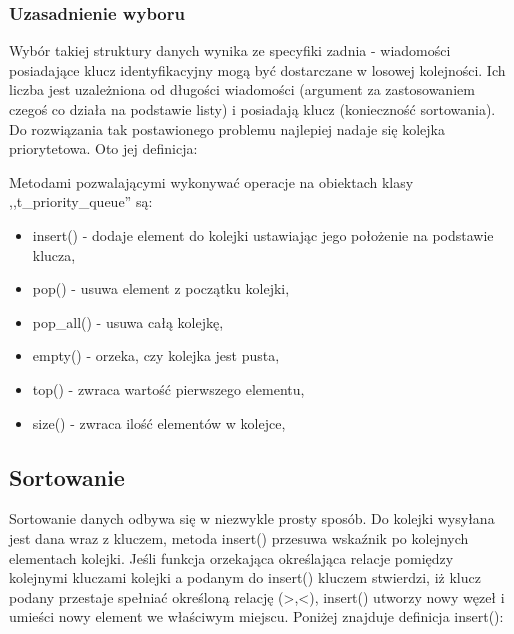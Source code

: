 \documentclass[12pt]{article}
\begin{document}
\subsubsection{Uzasadnienie wyboru}
 Wybór takiej struktury danych wynika ze specyfiki zadnia - wiadomości posiadające klucz identyfikacyjny mogą być dostarczane w losowej kolejności.
Ich liczba jest uzależniona od długości wiadomości (argument za zastosowaniem czegoś co działa na podstawie listy) i posiadają klucz (konieczność sortowania). 
Do rozwiązania tak postawionego problemu najlepiej nadaje się kolejka priorytetowa.  
Oto jej definicja:\\
\small{
}

Metodami pozwalającymi wykonywać operacje na obiektach klasy ,,t\_priority\_queue'' są:
\begin{itemize}
    \item insert() - dodaje element do kolejki ustawiając jego położenie na podstawie klucza,
    \item pop() - usuwa element z początku kolejki,
    \item pop\_all() - usuwa całą kolejkę,
    \item empty() - orzeka, czy kolejka jest pusta,
    \item top() - zwraca wartość pierwszego elementu,
    \item size() - zwraca ilość elementów w kolejce, 
\end{itemize}

\subsection{Sortowanie}

Sortowanie danych odbywa się w niezwykle prosty sposób. Do kolejki wysyłana jest dana wraz z kluczem, metoda insert()
przesuwa wskaźnik po kolejnych elementach kolejki. Jeśli funkcja orzekająca określająca relacje pomiędzy kolejnymi kluczami kolejki a
podanym do insert() kluczem stwierdzi, iż klucz podany przestaje spełniać określoną relację (>,<), insert()
utworzy nowy węzeł i umieści nowy element we właściwym miejscu. Poniżej znajduje definicja insert():
\end{document}
